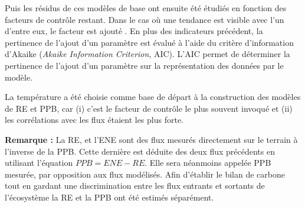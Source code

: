 Puis les résidus de ces modèles de base ont ensuite été étudiés en fonction des facteurs de contrôle restant.
Dans le cas où une tendance est visible avec l'un d'entre eux, le facteur est ajouté \plop.
En plus des indicateurs précédent, la pertinence de l'ajout d'un paramètre est évalué à l'aide du  critère d'information d'Akaike (\textit{Akaike Information Criterion}, AIC).
L'AIC permet de déterminer la pertinence de l'ajout d'un paramètre sur la représentation des données par le modèle.


 


La température a été choisie comme base de départ à la construction des modèles de RE et PPB, car (i) c'est le facteur de contrôle le plus souvent invoqué et (ii) les corrélations avec les flux étaient les plus forte.

\begin{center}
\begin{minipage}{.85\textwidth}
\setlength{\parindent}{-10pt}%
\onehalfspacing
\textbf{Remarque :} La RE, et l'ENE sont des flux mesurés directement sur le terrain à l'inverse de la PPB.
Cette dernière est déduite des deux flux précédents en utilisant l'équation $PPB = ENE - RE$.
Elle sera néanmoins appelée PPB mesurée, par opposition aux flux modélisés.
Afin d'établir le bilan de carbone tout en gardant une discrimination entre les flux entrants et sortants de l'écosystème la RE et la PPB ont été estimés séparément.
\end{minipage}
\end{center}


